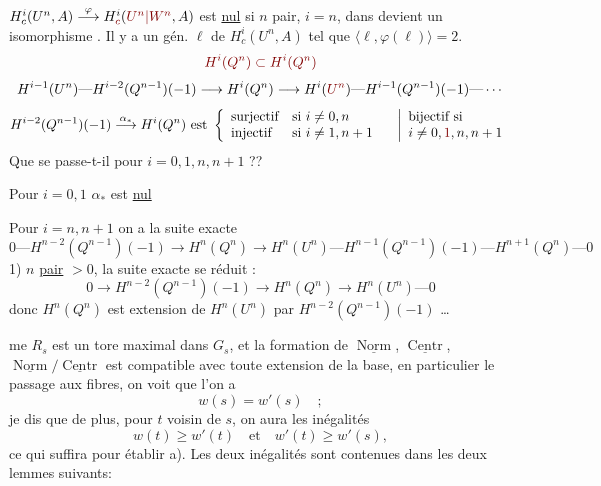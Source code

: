 $H_c^i(U^n,A)\overset{\varphi}{\longrightarrow}H_{\unsure{c}}^i(\unsure{U^n|W^n},A)$ est \uline{nul}  si $n$ pair, $i=n$, dans  devient un isomorphisme . Il y a un gén. $\ell$ de $H_c^i(U^n,A)$ tel que $\langle\ell,\varphi(\ell)\rangle=2$.
\[
\deleted{\unsure{H^i(Q^n)\subset H^i(Q^n)}}
\]
\[
H^{i-1}(U^n)\text{---}H^{i-2}(Q^{n-1})(-1)\longrightarrow H^i(Q^n)
\longrightarrow H^i(\unsure{U^n})\text{---}H^{i-1}(Q^{n-1})(-1)\text{---}\cdots
\]
\[
H^{i-2}(Q^{n-1})(-1)\overset{\alpha_*}{\longrightarrow}H^i(Q^n)
\text{ est }\left\{\begin{array}{ll}
\text{surjectif}&\text{si }i\neq0,n\\
\text{injectif}&\text{si }i\neq1,n+1
\end{array}\right.
\quad
\left|\begin{array}{l}
\text{bijectif si}\\
i\neq0,\unsure{1},n,n+1
\end{array}\right.
\]
Que se passe-t-il pour $i=0,1,n,n+1$ ??
    
Pour $i=0,1$ $\alpha_*$ est \uline{nul}
\margin{[$i=1$, \deleted{\unsure{bij}} $\alpha$ bijectif, car les deux \unsure{mbs} nuls)}
    
Pour $i=n,n+1$ on a la suite exacte \margin{(si $\boxed{n\neq1}$ donc $n-1\neq0$]}
\[
0\text{---}H^{n-2}(Q^{n-1})(-1)\longrightarrow H^n(Q^n)
\longrightarrow H^n(U^n)\text{---}H^{n-1}(Q^{n-1})(-1)\text{---}H^{n+1}(Q^n)\text{---}0
\]
1) $n$ \uline{pair} $>0$, la suite exacte se réduit :
\[
0\longrightarrow H^{n-2}(Q^{n-1})(-1)\longrightarrow H^n(Q^n)\longrightarrow H^n(U^n)\text{---}0
\]
donc $H^n(Q^n)$ est extension de $H^n(U^n)$ par $H^{n-2}(Q^{n-1})(-1)$ \ldots
{}


me $R_s$ est un tore maximal dans $G_s$, et la formation de $\underline{\operatorname{Norm}}$, $\underline{\operatorname{Centr}}$, $\underline{\operatorname{Norm}}/\underline{\operatorname{Centr}}$ est compatible avec toute extension de la base, en particulier le passage aux fibres, on voit que l'on a
\[
w(s)=w'(s)\quad;
\]
je dis que de plus, pour $t$ voisin de $s$, on aura les inégalités
\[
w(t)\geq w'(t)\quad\text{et}\quad w'(t)\geq w'(s),
\]
ce qui suffira pour établir a).  Les deux inégalités  sont contenues dans les deux lemmes suivants:

